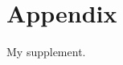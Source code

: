 \documentclass[../main.tex]{article}
\begin{document}
\section{Appendix}

My supplement.
\end{document}
